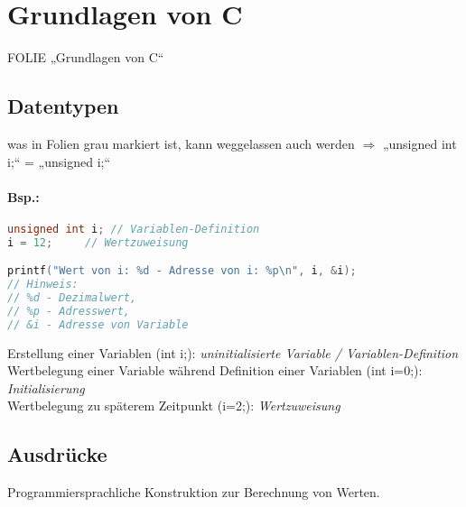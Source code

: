 \section{Grundlagen von C}

FOLIE „Grundlagen von C“

\subsection{Datentypen}
was in Folien grau markiert ist, kann weggelassen auch werden $\Rightarrow$ „unsigned int i;“ = „unsigned i;“

\paragraph{Bsp.:}

\begin{lstlisting}[language=C]
unsigned int i;	// Variablen-Definition
i = 12;		// Wertzuweisung

printf("Wert von i: %d - Adresse von i: %p\n", i, &i);
// Hinweis: 
// %d - Dezimalwert, 
// %p - Adresswert, 
// &i - Adresse von Variable
\end{lstlisting}
Erstellung einer Variablen (int i;): \emph{uninitialisierte Variable / Variablen-Definition}\\
Wertbelegung einer Variable während Definition einer Variablen (int i=0;): \emph{Initialisierung}\\
Wertbelegung zu späterem Zeitpunkt (i=2;): \emph{Wertzuweisung}

\subsection{Ausdrücke}
Programmiersprachliche Konstruktion zur Berechnung von Werten.
